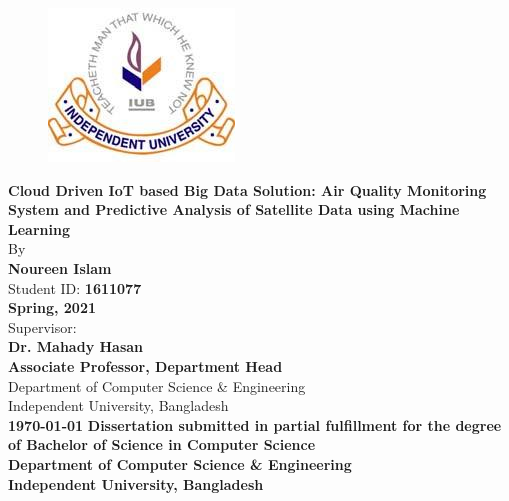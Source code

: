 \begin{titlepage}
\begin{center}
    \vspace*{1cm}
    
    \begin{figure}[H]
    \centering
     \includegraphics[scale=.7]{images/iub.jpg}
    \end{figure}
    
    \textbf{\Large Cloud Driven IoT based Big Data Solution: Air Quality Monitoring System and Predictive Analysis of Satellite Data using Machine Learning}\\
    \vspace{.5cm}
    By\\
    \vspace{.5cm}
    \textbf{\large Noureen Islam}\\
    \vspace{.5cm}
    Student ID: \textbf{1611077}\\
    \vspace{1cm}
    \textbf{\large Spring, 2021}\\
    \vspace{1cm}
    Supervisor: \\
    \textbf{\large Dr. Mahady Hasan}\\
    \vspace{.2cm}
    \textbf{Associate Professor, Department Head}\\
    \vspace{.2cm}
    Department of Computer Science \& Engineering\\
    \vspace{.2cm}
    Independent University, Bangladesh\\
    \vspace{1cm}
    \textbf{\large\today}
    \vfill
    \textbf{Dissertation submitted in partial fulfillment for the degree of Bachelor of Science in Computer Science}\\
    \vspace{.5cm}
    \textbf{Department of Computer Science \& Engineering}\\
    \vspace{.5cm}
    \textbf{\large Independent University, Bangladesh}
\end{center}
\end{titlepage}